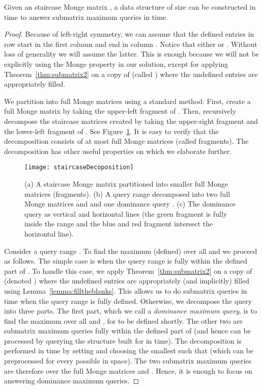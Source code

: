 \documentclass{llncs}
\begin{document}
\begin{theorem}
\label{thm:staircasesubmatrixlarge}
Given an  staircase Monge matrix , a data structure of size  can be constructed
in  time to answer submatrix maximum queries in  time.
\end{theorem}
\begin{proof}
Because of left-right symmetry, we can assume that the defined entries in row  
start in the first column and end in column . Notice that either  or .
Without loss of generality we will assume the latter. This is enough because we will not be explicitly using the Monge property in our
solution, except for applying Theorem~\ref{thm:submatrix2} on a copy of  (called ) where the undefined entries are
appropriately filled. 
 
We partition  into full Monge matrices using a standard method: First, create a full Monge matrix by taking the upper-left fragment  of . Then, recursively decompose the staircase  matrices created by taking the upper-right fragment  and the lower-left fragment  of . See Figure~\ref{fig:staircaseDecoposition}. It is easy to verify that
the decomposition consists of at most  full Monge matrices (called fragments). The decomposition has other useful
properties on which we elaborate further.

\begin{figure}[h]
\begin{center}
\texttt{[image: staircaseDecoposition]}
\end{center}
\caption{(a) A staircase  Monge matrix partitioned into  smaller full Monge matrices (fragments). (b) A query range  decomposed into two full Monge matrices  and  and one dominance query . (c) The dominance query as vertical and horizontal lines (the green fragment is fully inside the range and the blue and red fragment intersect the horizontal line). }
\label{fig:staircaseDecoposition}
\end{figure}

Consider a query range .
To find the maximum (defined)  over all  and  
we proceed as follows. The simple case is when the query range is fully within the defined part of . To handle this case, we apply Theorem~\ref{thm:submatrix2} on a copy of  (denoted ) where the undefined entries are appropriately (and implicitly) filled using Lemma~\ref{lemma:filltheblanks}. This allows us to do submatrix queries in  time when the query range is fully defined.
Otherwise, we decompose the query into three parts. 
The first part, which we call a \emph{dominance maximum query}, is to
find the maximum  over all  and , for
 to be defined shortly.
The other two are submatrix maximum queries fully within the defined part of  (and hence can be processed by querying the
structure built for  in  time). The decomposition is performed in  time by setting
 and choosing the smallest  such that  (which can be preprocessed for every possible
 in  space). The two submatrix maximum queries are therefore over the full Monge matrices  and  . Hence,
it is enough to focus on answering dominance maximum queries.


\end{proof}
\end{document}
